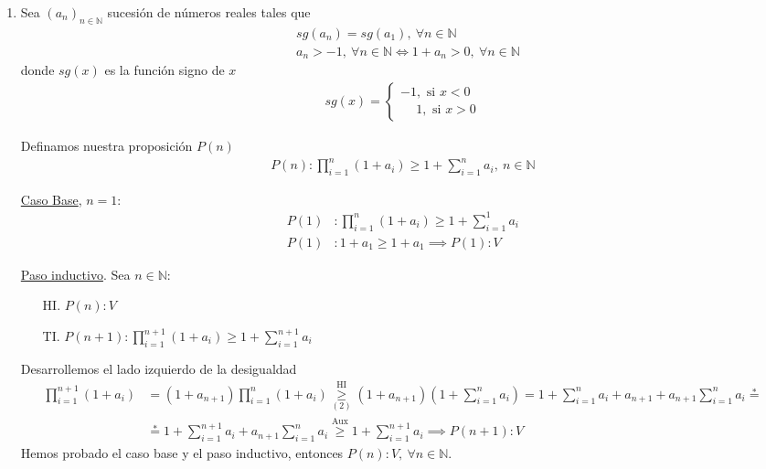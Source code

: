 \begin{enumerate}[label=\roman*)]
  \item Sea $(a_n)_{n \in \mathbb{N}}$ sucesión de números reales tales que
  \begin{align}
    &sg(a_n) = sg(a_1), \ \forall n \in \mathbb{N} \\
    &a_n > -1, \ \forall n \in \mathbb{N} \iff 1 + a_n > 0, \ \forall n \in \mathbb{N}
  \end{align}
  donde $sg(x)$ es la función signo de $x$
  \begin{align*}
    sg(x) = \begin{cases}
              -1, \text{ si } x < 0 \\
              \phantom{-}1, \text{ si } x > 0
            \end{cases}
  \end{align*}

  Definamos nuestra proposición $P(n)$ 
  \begin{align*}
    P(n): \prod_{i=1}^{n} (1 + a_i) \geq 1 + \sum_{i=1}^{n}a_i, \ n \in \mathbb{N}
  \end{align*}

  \underline{Caso Base}, $n = 1$:
  \begin{align*}
  P(1)&: \prod_{i=1}^{n} (1 + a_i) \geq 1 + \sum_{i=1}^{1}a_i \\
  P(1)&: 1 + a_1 \geq 1 + a_1 \implies P(1):V
  \end{align*}

  \underline{Paso inductivo}. Sea $n \in \mathbb{N}$:
  \begin{enumerate}
    \item[HI.] $P(n): V$
    \item[TI.] $P(n+1): \displaystyle \prod_{i=1}^{n+1} (1 + a_i) \geq 1 + \sum_{i=1}^{n+1}a_i$
  \end{enumerate}
  Desarrollemos el lado izquierdo de la desigualdad
  \begin{align*}
    \prod_{i=1}^{n+1} (1 + a_i) &= (1 + a_{n+1}) \prod_{i=1}^{n} (1 + a_i) \overset{\text{HI}}{\underset{(2)}{\geq}} 
    (1 + a_{n+1}) \left(1 + \sum_{i=1}^{n}a_i\right) = 1 + \sum_{i=1}^{n}a_i + a_{n+1} + a_{n+1}\sum_{i=1}^{n}a_i 
    \overset{*}{=} \\
    &\overset{*}{=} 1 + \sum_{i=1}^{n+1}a_i + a_{n+1}\sum_{i=1}^{n}a_i \overset{\text{Aux}}{\geq}
    1 + \sum_{i=1}^{n+1}a_i \implies P(n+1):V 
  \end{align*}
  Hemos probado el caso base y el paso inductivo, entonces $P(n): V, \ \forall n \in \mathbb{N}$.

\end{enumerate}
